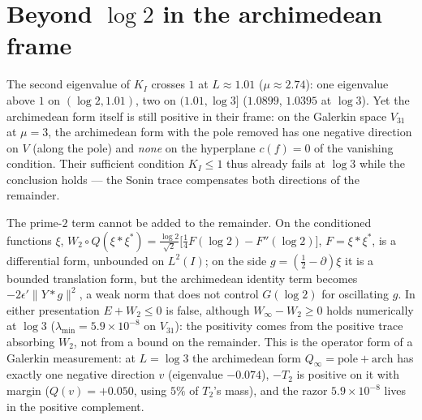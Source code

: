 \documentclass[11pt]{article}
\begin{document}
\section{Beyond $\log 2$ in the archimedean frame}
The second eigenvalue of $K_I$ crosses $1$ at $L\approx1.01$ ($\mu\approx2.74$): one eigenvalue above $1$ on $(\log2,1.01)$, two on $(1.01,\log3]$ ($1.0899$, $1.0395$ at $\log3$). Yet the archimedean form itself is still positive in their frame: on the Galerkin space $V_{31}$ at $\mu=3$, the archimedean form with the pole removed has one negative direction on $V$ (along the pole) and \emph{none} on the hyperplane $c(f)=0$ of the vanishing condition. Their sufficient condition $K_I\le1$ thus already fails at $\log3$ while the conclusion holds --- the Sonin trace compensates both directions of the remainder.

The prime-$2$ term cannot be added to the remainder. On the conditioned functions $\xi$, $W_2\circ Q(\xi*\xi^*)=\tfrac{\log2}{\sqrt2}\bigl[\tfrac14F(\log2)-F''(\log2)\bigr]$, $F=\xi*\xi^*$, is a differential form, unbounded on $L^2(I)$; on the side $g=(\tfrac12-\partial)\xi$ it is a bounded translation form, but the archimedean identity term becomes $-2\epsilon'\|Y*g\|^2$, a weak norm that does not control $G(\log2)$ for oscillating $g$. In either presentation $E+W_2\le0$ is false, although $W_\infty-W_2\ge0$ holds numerically at $\log3$ ($\lambda_{\min}=5.9\times10^{-8}$ on $V_{31}$): the positivity comes from the positive trace absorbing $W_2$, not from a bound on the remainder. This is the operator form of a Galerkin measurement: at $L=\log3$ the archimedean form $Q_\infty=\mathrm{pole}+\mathrm{arch}$ has exactly one negative direction $v$ (eigenvalue $-0.074$), $-T_2$ is positive on it with margin ($Q(v)=+0.050$, using $5\%$ of $T_2$'s mass), and the razor $5.9\times10^{-8}$ lives in the positive complement.
\end{document}
